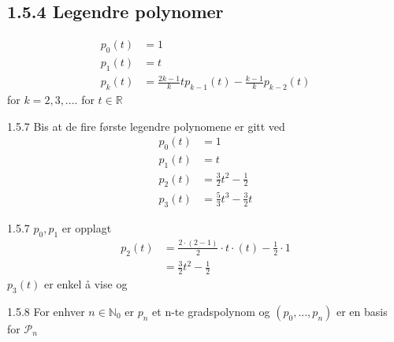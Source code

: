 \documentclass[a4paper,norsk]{article}
\begin{document}
\subsection*{1.5.4 Legendre polynomer}

\begin{align*}
    p_0(t) &= 1\\
    p_1(t) &= t\\
    p_k(t) &= \frac{ 2k -1 }{ k } t p_{k-1}(t) - \frac{ k-1 }{ k }p_{k-2}(t)
\end{align*}
for $ k=2, 3,.... $ for $ t \in \mathbb{R} $  

\begin{oppgavebox}{1.5.7}{}
Bis at de fire første legendre polynomene er gitt ved 
\begin{align*}
    p_0(t) &=1 \\
    p_1(t) &= t\\
    p_2(t) &= \frac{ 3 }{ 2 }t^2 - \frac{ 1 }{ 2 }\\
    p_3(t) &= \frac{ 5 }{ 3 }t^3 - \frac{ 3 }{ 2 } t
\end{align*}

\begin{proofbox}{1.5.7}{}
$ p_0, p_1 $ er opplagt
\begin{align*}
    p_2(t) &= \frac{ 2 \cdot \left( 2-1 \right)  }{ 2 } \cdot t \cdot \left( t \right) - \frac{ 1 }{ 2 } \cdot 1\\
    &= \frac{ 3 }{ 2 }t^2 - \frac{ 1 }{ 2 }
\end{align*}
$ p_3(t) $ er enkel å vise og
\end{proofbox}
\end{oppgavebox}

\begin{propositionbox}{1.5.8}{}
For enhver $ n \in \mathbb{N}_0 $ er $ p_n $ et n-te gradspolynom og $ \left( p_0, ..., p_n \right)  $ er en basis for $ \mathcal{P}_n $ 
\end{propositionbox}
\end{document}
